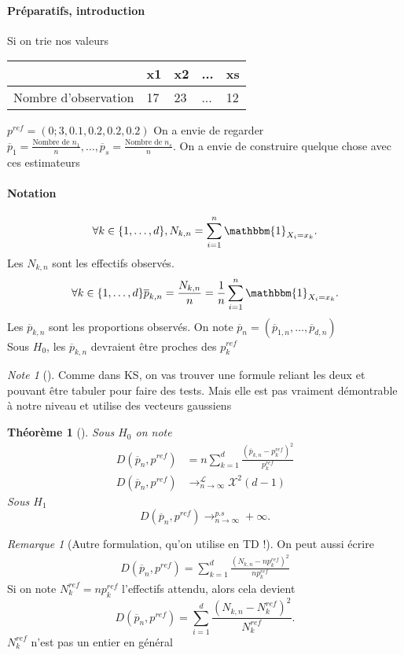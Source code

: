 \documentclass{article}
\theoremstyle{plain}%
\newtheorem{thm}{Théorème}[section]
\theoremstyle{definition}
\theoremstyle{remark}
\newtheorem*{rem}{Remarque}
\newtheorem*{note}{Note}
\begin{document}
\paragraph{Préparatifs, introduction } Si on trie nos valeurs 
\begin{table}[!h]
    \centering
    \begin{tabular}{|l|l|l|l|l|}
    \hline
        ~ & x1 & x2 & ... & xs \\ \hline
        Nombre d'observation & 17 & 23 & ... & 12 \\ \hline
    \end{tabular}
\end{table}
$ p^{ref} = (0;3, 0.1, 0.2, 0.2, 0.2) $ On a envie de regarder $ \overline{p}_1 = \frac{\text{Nombre de } n_1}{n}, \dots, \overline{p}_s = \frac{\text{Nombre de }n_s}{n}$. On a envie de construire quelque chose avec ces estimateurs 

\paragraph*{Notation} 

\[
    \forall k \in \{1,\dots,d\}, N_{k,n} = \sum_{i=1}^{n}\mathbbm{1}_{X_i = x_k}
.\]
Les $ N_{k,n} $ sont les effectifs observés.
\[
    \forall k \in \{1,\dots,d\} \overline{p}_{k,n} = \frac{N_{k,n}}{n} = \frac{1}{n}\sum_{i=1}^{n}\mathbbm{1}_{X_i = x_k}
.\]
Les $ \overline{p}_{k,n} $ sont les proportions observés. On note $ \overline{p}_n = (\overline{p}_{1,n}, \dots, \overline{p}_{d,n}) $ \\
Sous $ H_0 $, les $ \overline{p}_{k,n} $ devraient être proches des $ p_k^{ref} $ 

\begin{note}[]
    Comme dans KS, on vas trouver une formule reliant les deux et pouvant être tabuler pour faire des tests. Mais elle est pas vraiment démontrable à notre niveau et utilise des vecteurs gaussiens
\end{note}

\begin{thm}[]
    Sous $ H_0 $ on note 
    \begin{align*}
        D(\overline{p}_n, p^{ref}) &= n \sum_{k=1}^{d}\frac{(\overline{p}_{k,n} - p_k^{ref})^2}{p_k^{ref}} \\
        D(\overline{p}_n, p^{ref}) &\to ^{\mathcal{L}}_{n \to \infty } \mathcal{X}^2(d-1)
    \end{align*}
    Sous $ H_1 $ 
    \[
        D(\overline{p}_n, p^{ref}) \to^{p.s}_{n \to \infty } + \infty 
    .\]
\end{thm}
\begin{rem}[Autre formulation, qu'on utilise en TD !]
    On peut aussi écrire 
    \begin{align*}
        D(\overline{p}_n, p^{ref}) = \sum_{k=1}^{d} \frac{(N_{k,n} - np_k^{ref})^2}{n p_k^{ref}}
    \end{align*}
    Si on note $ N_k^{ref} = np_k^{ref} $ l'effectifs attendu, alors cela devient 
    \[
        D(\overline{p}_n, p^{ref}) = \sum_{i=1}^{d} \frac{(N_{k,n} - N_k^{ref})^2}{N_k^{ref}}
    .\]
    $ N_k^{ref} $ n'est pas un entier en général
\end{rem}
\end{document}
